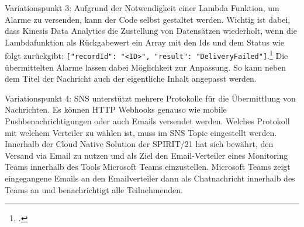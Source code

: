 Variationspunkt 3: Aufgrund der Notwendigkeit einer Lambda Funktion, um Alarme zu versenden, kann der Code selbst gestaltet werden. Wichtig ist dabei, dass Kinesis Data Analytics die Zustellung von Datensätzen wiederholt, wenn die Lambdafunktion als Rückgabewert ein Array mit den Ids und dem Status wie folgt zurückgibt: \texttt{[{"recordId": "<ID>", "result": "DeliveryFailed"}]}.\footcite[Vgl.][]{AmazonWebServicesInc..o.J.ay} Die übermittelten Alarme lassen dabei Möglichkeit zur Anpassung. So kann neben dem Titel der Nachricht auch der eigentliche Inhalt angepasst werden. 

Variationspunkt 4: \ac{SNS} unterstützt mehrere Protokolle für die Übermittlung von Nachrichten. Es können HTTP Webhooks genauso wie mobile Pushbenachrichtigungen oder auch Emails versendet werden. Welches Protokoll mit welchem Verteiler zu wählen ist, muss im \ac{SNS} Topic eingestellt werden. Innerhalb der Cloud Native Solution der SPIRIT/21 hat sich bewährt, den Versand via Email zu nutzen und als Ziel den Email-Verteiler eines Monitoring Teams innerhalb des Tools Microsoft Teams einzustellen. Microsoft Teams zeigt eingegangene Emails an den Emailverteiler dann als Chatnachricht innerhalb des Teams an und benachrichtigt alle Teilnehmenden.

